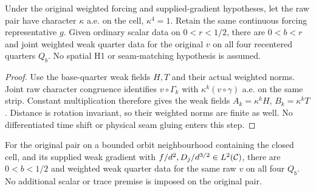 \begin{lemma}
\label{lem:weighted-character-quarter-derivatives}
\leanok
Under the original weighted forcing and supplied-gradient hypotheses,
let the raw pair have character $\kappa$ a.e. on the cell, $\kappa^4=1$.
Retain the same continuous forcing representative $g$.
Given ordinary scalar data on $0<r<1/2$, there are $0<b<r$ and joint
weighted weak quarter data for the original $v$ on all four recentered
quarters $Q_b$.
No spatial H1 or seam-matching hypothesis is assumed.
\end{lemma}

\begin{proof}
\leanok
Use the base-quarter weak fields $H,T$ and their actual weighted norms.
Joint raw character congruence identifies $v\circ\Gamma_k$ with
$\kappa^k(v\circ\gamma)$ a.e. on the same strip.
Constant multiplication therefore gives the weak fields
$A_k=\kappa^kH$, $B_k=\kappa^kT$.
Distance is rotation invariant, so their weighted norms are finite as well.
No differentiated time shift or physical seam gluing enters this step.
\end{proof}

\begin{lemma}
\label{lem:weighted-transport-quarter-assembly}
\leanok
For the original pair on a bounded orbit neighbourhood containing the closed
cell, and its supplied weak gradient with
$f/d^2,D_j/d^{3/2}\in L^2(\mathcal{C})$, there are $0<b<1/2$ and weighted
weak quarter data for the same raw $v$ on all four $Q_b$.
No additional scalar or trace premise is imposed on the original pair.
\end{lemma}

